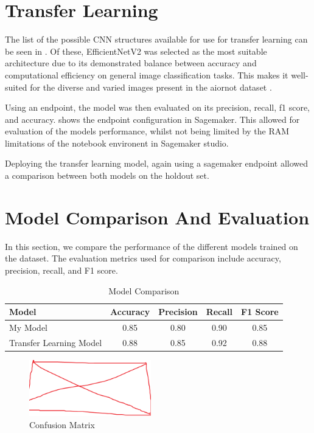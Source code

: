 \section{Transfer Learning}

The list of the possible CNN structures available for use for transfer learning can be seen in \cite{keras_applications}. Of these, EfficientNetV2 was selected as the most suitable architecture due to its demonstrated balance between accuracy and computational efficiency on general image classification tasks. This makes it well-suited for the diverse and varied images present in the aiornot dataset \cite{keras_applications, tan2021efficientnetv2}.

Using an endpoint, the model was then evaluated on its precision, recall, f1 score, and accuracy.  shows the endpoint configuration in Sagemaker. This allowed for evaluation of the models performance, whilst not being limited by the RAM limitations of the notebook environent in Sagemaker studio. 

Deploying the transfer learning model, again using a sagemaker endpoint allowed a comparison between both models on the holdout set.

\section{Model Comparison And Evaluation}

In this section, we compare the performance of the different models trained on the dataset. The evaluation metrics used for comparison include accuracy, precision, recall, and F1 score. 

\begin{table}[h]
\centering
\caption{Model Comparison}
\begin{tabular}{lcccc}
\toprule
\textbf{Model} & \textbf{Accuracy} & \textbf{Precision} & \textbf{Recall} & \textbf{F1 Score} \\
\midrule
My Model & 0.85 & 0.80 & 0.90 & 0.85 \\
Transfer Learning Model & 0.88 & 0.85 & 0.92 & 0.88 \\
\bottomrule
\end{tabular}
\label{tab:model_comparison}
\end{table}

\begin{figure}[h]
    \centering
    \includegraphics[width=200px]{figures/placeholder.png} %
    \centering
    \caption{Confusion Matrix} %
    \label{fig:confusion_matrix_my_model} %
\end{figure}


